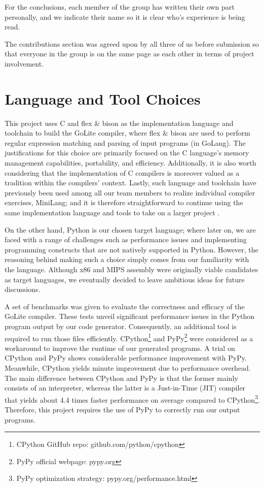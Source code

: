 \documentclass{article}
\begin{document}

For the conclusions, each member of the group has written their own part personally, and we indicate their name so it is clear who's experience is being read.


The contributions section was agreed upon by all three of us before submission so that everyone in the group is on the same page as each other in terms of project involvement.


\section{Language and Tool Choices}
This project uses C and flex \& bison as the implementation language and toolchain to build the GoLite compiler, where flex \& bison are used to perform regular expression matching and parsing of input programs (in GoLang). The justifications for this choice are primarily focused on the C language’s memory management capabilities, portability, and efficiency. Additionally, it is also worth considering that the implementation of C compilers is moreover valued as a tradition within the compilers’ context. Lastly, such language and toolchain have previously been used among all our team members to realize individual compiler exercises, MiniLang; and it is therefore straightforward to continue using the same implementation language and tools to take on a larger project \citep{ass1, ass2}.

On the other hand, Python is our chosen target language; where later on, we are faced with a range of challenges such as performance issues and implementing programming constructs that are not natively supported in Python. However, the reasoning behind making such a choice simply comes from our familiarity with the language. Although x86 and MIPS assembly were originally viable candidates as target languages, we eventually decided to leave ambitious ideas for future discussions.

A set of benchmarks was given to evaluate the correctness and efficacy of the GoLite compiler. These tests unveil significant performance issues in the Python program output by our code generator. Consequently, an additional tool is required to run those files efficiently. CPython\footnote{CPython GitHub repo: github.com/python/cpython} and PyPy\footnote{PyPy official webpage: pypy.org} were considered as a workaround to improve the runtime of our generated programs. A trial on CPython and PyPy shows considerable performance improvement with PyPy. Meanwhile, CPython yields minute improvement due to performance overhead. The main difference between CPython and PyPy is that the former mainly consists of an interpreter, whereas the latter is a Just-in-Time (JIT) compiler that yields about 4.4 times faster performance on average compared to CPython\footnote{PyPy optimization strategy: pypy.org/performance.html}. Therefore, this project requires the use of PyPy to correctly run our output programs.
\end{document}
